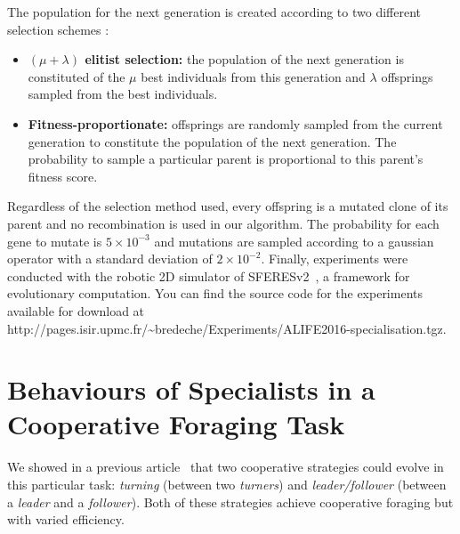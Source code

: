   The population for the next generation is created according to two different selection schemes :

  \begin{itemize}
    \item{\textbf{\((\mu + \lambda)\) elitist selection:} the population of the next generation is constituted of the $\mu$ best individuals from this generation and $\lambda$ offsprings sampled from the best individuals.}
    \item{\textbf{Fitness-proportionate:} offsprings are randomly sampled from the current generation to constitute the population of the next generation. The probability to sample a particular parent is proportional to this parent's fitness score.}
  \end{itemize}

  Regardless of the selection method used, every offspring is a mutated clone of its parent and no recombination is used in our algorithm. The probability for each gene to mutate is \(5 \times 10^{-3}\) and mutations are sampled according to a gaussian operator with a standard deviation of \(2 \times 10^{-2}\). Finally, experiments were conducted with the robotic 2D simulator of SFERESv2~\parencite{Mouret2010}, a framework for evolutionary computation. You can find the source code for the experiments available for download at http://pages.isir.upmc.fr/\textasciitilde bredeche/Experiments/ALIFE2016-specialisation.tgz.
    

\section{Behaviours of Specialists in a Cooperative Foraging Task}
\label{sec:efficiency}
  We showed in a previous article~\parencite{Bernard2015} that two cooperative strategies could evolve in this particular task: \emph{turning} (between two \emph{turners}) and \emph{leader/follower} (between a \emph{leader} and a \emph{follower}). Both of these strategies achieve cooperative foraging but with varied efficiency.

